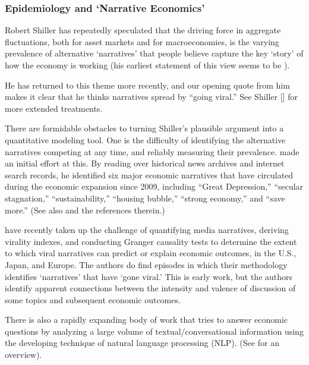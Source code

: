 
\subsubsection{Epidemiology and `Narrative Economics'}\label{narrativeApproach}

Robert Shiller has repeatedly speculated that the driving force in aggregate fluctuations, both for asset markets and for macroeconomies, is the varying prevalence of alternative `narratives' that people believe capture the key `story' of how the economy is working (his earliest statement of this view seems to be \href{https://www.jstor.org/stable/2117915}{\cite{shiller1995conversation}}).

He has returned to this theme more recently, and our opening quote from him makes it clear that he thinks narratives spread by ``going viral.''  See Shiller [\citeyear{shiller2017narrative,shiller_narrative_2019}] for more extended treatments.

There are formidable obstacles to turning Shiller's plausible argument into a quantitative modeling tool.  One is the difficulty of identifying the alternative narratives competing at any time, and reliably measuring their prevalence.
\href{https://github.com/iworld1991/EpiExp/blob/master/Literature/shiller2020popular.pdf}{\cite{shiller2020popular}} made an initial effort at this.  By reading over historical news archives and internet search records, he identified six major economic narratives that have circulated during the economic expansion since 2009, including ``Great Depression,'' ``secular stagnation,'' ``sustainability,'' ``housing bubble,'' ``strong economy,'' and ``save more.''  (See also  \cite{ash2021text} and the references therein.)

\cite{larsen2019business} have recently taken up the challenge of quantifying media narratives, deriving virality indexes, and conducting Granger causality tests to determine the extent to which viral narratives can predict or explain economic outcomes, in the U.S., Japan, and Europe.  The authors do find episodes in which their methodology identifies `narratives' that have `gone viral.'  This is early work, but the authors identify apparent connections between the intensity and valence of discussion of some topics and subsequent economic outcomes.

There is also a rapidly expanding body of work that tries to answer economic questions by analyzing a large volume of textual/conversational information using the developing technique of natural language processing (NLP).  (See \cite{gentzkow2019text} for an overview).

